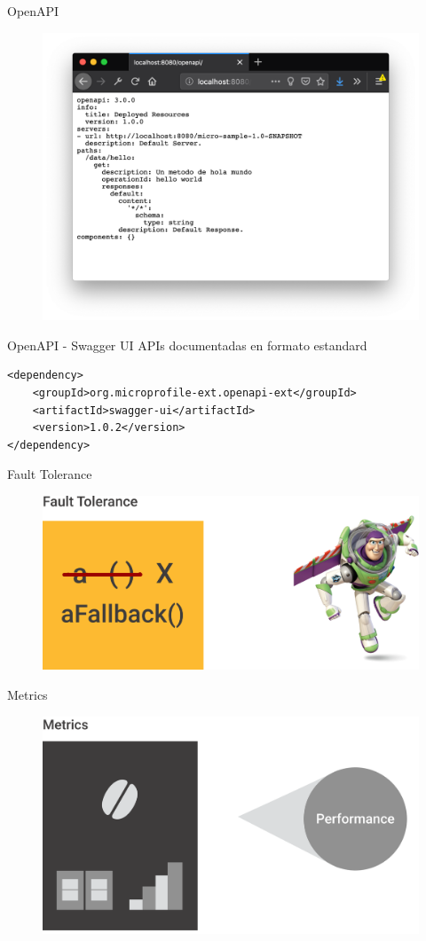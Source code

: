 \documentclass[aspectratio=169]{beamer}
\begin{document}
\begin{frame}{OpenAPI}
\begin{figure}
	\centering
	\includegraphics[width=0.75\linewidth]{Images/openapi}
\end{figure}
\end{frame}

\begin{frame}[fragile]{OpenAPI - Swagger UI}
APIs documentadas en formato estandard
\begin{lstlisting}
<dependency>
	<groupId>org.microprofile-ext.openapi-ext</groupId>
	<artifactId>swagger-ui</artifactId>
	<version>1.0.2</version>
</dependency>
\end{lstlisting}
\end{frame}

\begin{frame}{Fault Tolerance}
\begin{figure}
	\centering
	\includegraphics[width=0.75\linewidth]{Images/faulttolerance}
\end{figure}
\end{frame}

\begin{frame}{Metrics}
\begin{figure}
	\centering
	\includegraphics[width=0.75\linewidth]{Images/metrics}
\end{figure}
\end{frame}
\end{document}
